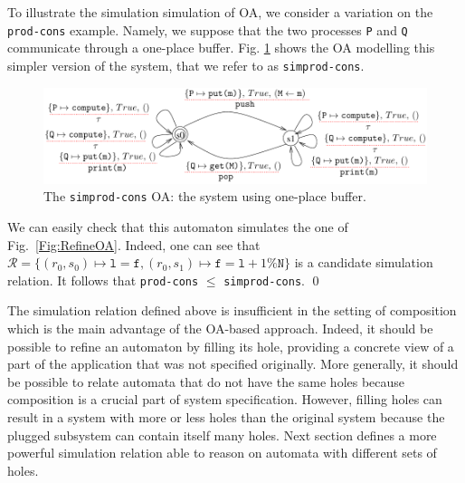 \documentclass[runningheads]{llncs}
\begin{document}
\begin{example} \label{example:fifo-system-one}
To illustrate the simulation simulation of OA, we consider a variation on the \texttt{prod-cons} example. Namely,  we suppose that  the two processes  \texttt{P} and  \texttt{Q} communicate through a one-place  buffer. Fig. \ref{Fig:SpecOA} shows the OA modelling this simpler version of the system, that we refer to as \texttt{simprod-cons}. 
\begin{figure}[!b]
 \centering
   \includegraphics[width=.90\textwidth]{Figures/FIFOpen2.pdf}
   \caption{  The \texttt{simprod-cons} OA: the system using one-place  buffer.  \label{Fig:SpecOA}}
\end{figure}
We can easily check that this automaton simulates the one of Fig.~\ref{Fig:RefineOA}.
Indeed, one can see that  $\mathcal{R}=\{(r_0,s_0) \mapsto \texttt{l}=\texttt{f}, (r_0,s_1) \mapsto \texttt{f}=\texttt{l}+1\% \texttt{N} \}$ is  a candidate simulation 
relation. It follows that  \texttt{prod-cons} $\leq$ \texttt{simprod-cons}. \qed
\end{example}




The simulation relation defined above is insufficient in the setting of composition which is the main advantage of the OA-based approach. Indeed, it should be possible to refine an automaton by filling its hole, providing a concrete view of a part of the application that was not specified originally. 
More generally, it should be possible to relate automata that do not have the same holes because composition is a crucial part of system specification.
However, filling holes can result in a system with more or less holes than the original system because the plugged subsystem can contain itself many holes.
Next section  defines  a more powerful simulation relation able to reason on automata with different sets of holes.
\end{document}
